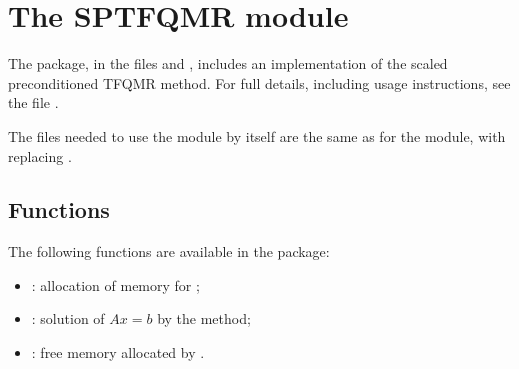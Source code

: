 
\section{The SPTFQMR module}\label{ss:sptfqmr}

The {\sptfqmr} package, in the files  and , includes an
implementation of the scaled preconditioned TFQMR method.  
For full details, including usage instructions, see the file .

The files needed to use the {\sptfqmr} module by itself are the same as for the
{\spgmr} module, with  replacing .


\subsection{Functions}
The following functions are available in the {\sptfqmr} package:  
\begin{itemize}
\item {}: allocation of memory for ;
\item {}: solution of $Ax = b$ by the {\sptfqmr} method;
\item {}: free memory allocated by .
\end{itemize}
